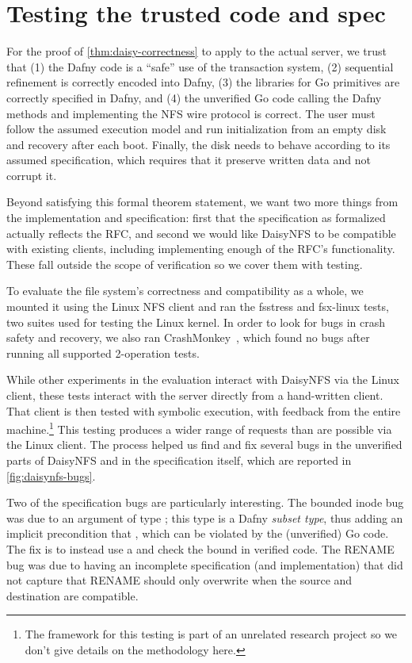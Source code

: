\section{Testing the trusted code and spec}

For the proof of \cref{thm:daisy-correctness} to apply to the actual server, we trust that (1) the
Dafny code is a ``safe'' use of the transaction system, (2) sequential
refinement is correctly encoded into Dafny, (3) the libraries for Go primitives
are correctly specified in Dafny, and (4) the unverified Go code calling the
Dafny methods and implementing the NFS wire protocol is correct. The
user must follow the assumed execution model and run initialization from an
empty disk and recovery after each boot. Finally, the disk needs to behave
according to its assumed specification, which requires that it preserve written
data and not corrupt it.

Beyond satisfying this formal theorem statement, we want two more things from
the implementation and specification: first that the specification as formalized
actually reflects the RFC, and second we would like DaisyNFS to be compatible
with existing clients, including implementing enough of the RFC's functionality.
These fall outside the scope of verification so we cover them with testing.

To evaluate the file system's correctness and compatibility as a whole, we
mounted it using the Linux NFS client and ran the fsstress and fsx-linux tests,
two suites used for testing the Linux kernel. In order to look for bugs in crash
safety and recovery, we also ran CrashMonkey~\cite{mohan:crashmonkey}, which
found no bugs after running all supported 2-operation tests.

While other experiments in the evaluation interact with DaisyNFS via the Linux
client, these tests interact with the server directly from a hand-written
client. That client is then tested with symbolic execution, with feedback from
the entire machine.\footnote{The framework for this testing is part of an
unrelated research project so we don't give details on the methodology here.}
This testing produces a wider range of requests than are possible via the Linux
client. The process helped us find and fix several bugs in the unverified parts
of DaisyNFS and in the specification itself, which are reported in
\cref{fig:daisynfs-bugs}.

Two of the specification bugs are particularly interesting. The bounded inode bug
was due to an  argument of type ; this type is a Dafny
\emph{subset type}, thus adding an implicit precondition that , which can be violated by the (unverified) Go code. The fix is to instead
use a  and check the bound in verified code. The RENAME bug was due
to having an incomplete specification (and implementation) that did not capture
that RENAME should only overwrite when the source and destination are
compatible.

